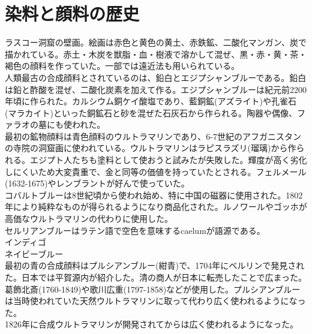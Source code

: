 	\section{染料と顔料の歴史}
		ラスコー洞窟の壁画。絵画は赤色と黄色の黄土、赤鉄鉱、二酸化マンガン、炭で描かれている。赤土・木炭を獣脂・血・樹液で溶かして混ぜ、黒・赤・黄・茶・褐色の顔料を作っていた。一部では遠近法も用いられている。\\
		人類最古の合成顔料とされているのは、鉛白とエジプシャンブルーである。鉛白は鉛と酢酸を混ぜ、二酸化炭素を加えて作る。エジプシャンブルーは紀元前2200年頃に作られた。カルシウム銅ケイ酸塩であり、藍銅鉱(アズライト)や孔雀石(マラカイト)といった銅鉱石と砂を混ぜた石灰石から作られる。陶器や偶像、ファラオの墓にも使われた。\\
		最初の鉱物顔料は青色顔料のウルトラマリンであり、6-7世紀のアフガニスタンの寺院の洞窟画に使われている。ウルトラマリンはラピスラズリ(瑠璃)から作られる。エジプト人たちも塗料として使おうと試みたが失敗した。輝度が高く劣化しにくいため大変貴重で、金と同等の価値を持っていたとされる。フェルメール(1632-1675)やレンブラントが好んで使っていた。\\
		コバルトブルーは8世紀頃から使われ始め、特に中国の磁器に使用された。1802年により純粋なものが得られるようになり商品化された。ルノワールやゴッホが高価なウルトラマリンの代わりに使用した。\\
		セルリアンブルーはラテン語で空色を意味するcaelumが語源である。\\
		インディゴ\\
		ネイビーブルー\\
		最初の青の合成顔料はプルシアンブルー(紺青)で、1704年にベルリンで発見された。日本では平賀源内が紹介した。清の商人が日本に転売したことで広まった。葛飾北斎(1760-1849)や歌川広重(1797-1858)などが使用した。プルシアンブルーは当時使われていた天然ウルトラマリンに取って代わり広く使われるようになった。\\
		1826年に合成ウルトラマリンが開発されてからは広く使われるようになった。\\
